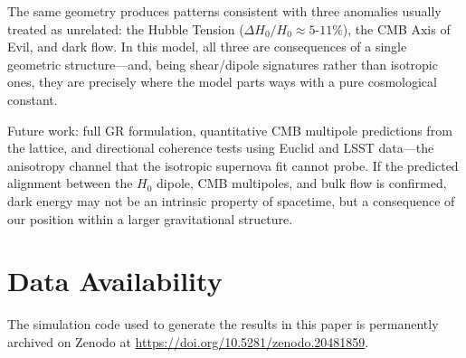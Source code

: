 \documentclass{article}
\begin{document}
The same geometry produces patterns consistent with three anomalies usually treated as unrelated: the Hubble Tension ($\Delta H_0/H_0 \approx 5$-$11\%$), the CMB Axis of Evil, and dark flow.
In this model, all three are consequences of a single geometric structure---and, being shear/dipole signatures rather than isotropic ones, they are precisely where the model parts ways with a pure cosmological constant.

Future work: full GR formulation, quantitative CMB multipole predictions from the lattice, and directional coherence tests using Euclid and LSST data---the anisotropy channel that the isotropic supernova fit cannot probe.
If the predicted alignment between the $H_0$ dipole, CMB multipoles, and bulk flow is confirmed, dark energy may not be an intrinsic property of spacetime, but a consequence of our position within a larger gravitational structure.

\section*{Data Availability}
The simulation code used to generate the results in this paper is permanently archived on Zenodo at \url{https://doi.org/10.5281/zenodo.20481859}.
\end{document}
